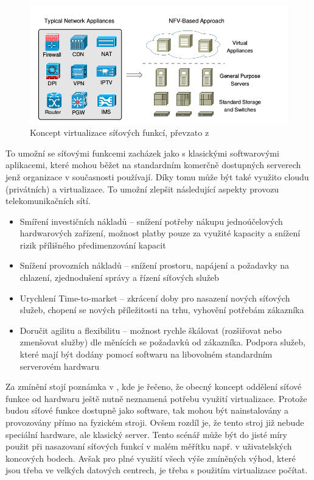 \begin{figure}[h]
\begin{centering}
\includegraphics[scale=0.5]{images/vize_NFV}
\par\end{centering}
\caption{Koncept virtualizace síťových funkcí, převzato z \cite{NFVChalanges}\label{fig:vize_NFV}}
\end{figure}

To umožní se síťovými funkcemi zacházek jako s klasickými softwarovými aplikacemi, které mohou běžet na standardním komerčně dostupných serverech jenž organizace v současnosti používají. Díky tomu může být také využito cloudu (privátních) a virtualizace. To umožní zlepšit následující aspekty provozu telekomunikačních sítí.

\begin{itemize}
\item Smíření investičních nákladů – snížení potřeby nákupu jednoúčelových hardwarových zařízení, možnost platby pouze za využité kapacity a snížení rizik přílišného předimenzování kapacit
\item Snížení provozních nákladů – snížení prostoru, napájení a požadavky na chlazení, zjednodušení správy a řízení síťových služeb
\item Urychlení Time-to-market – zkrácení doby pro nasazení nových síťových služeb, chopení se nových příležitosti na trhu, vyhovění potřebám zákazníka
\item Doručit agilitu a flexibilitu – možnost rychle škálovat (rozšiřovat nebo zmenšovat služby) dle měnících se požadavků od zákazníka. Podpora služeb, které mají být dodány pomocí softwaru na libovolném standardním serverovém hardwaru
\end{itemize}

Za zmínění stojí poznámka v \cite{NFVState}, kde je řečeno, že obecný koncept oddělení síťové funkce od hardwaru ještě nutně neznamená potřebu využití virtualizace. Protože budou síťové funkce dostupně jako software, tak mohou být nainstalovány a provozovány přímo na fyzickém stroji. Ovšem rozdíl je, že tento stroj již nebude speciální hardware, ale klasický server. Tento scénář může být do jisté míry použit při nasazovaní síťových funkcí v malém měřítku např. v uživatelských koncových bodech. Avšak pro plné využití všech výše zmíněných výhod, které jsou třeba ve velkých datových centrech, je třeba s použitím virtualizace počítat.

